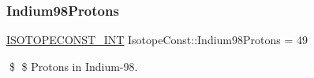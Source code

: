 \subsubsection{\texorpdfstring{Indium98\+Protons}{Indium98Protons}}
{\footnotesize\ttfamily \mbox{\hyperlink{group___isotope_const-_macros_ga5f18360b3e99483a35c32d789e62621c}{I\+S\+O\+T\+O\+P\+E\+C\+O\+N\+S\+T\+\_\+\+I\+NT}} Isotope\+Const\+::\+Indium98\+Protons = 49}

\$ \$ Protons in Indium-\/98. 